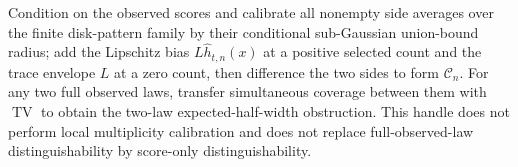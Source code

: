 Condition on the observed scores and calibrate all nonempty side averages over the finite disk-pattern family by their conditional sub-Gaussian union-bound radius; add the Lipschitz bias \(L\widehat h_{t,n}(x)\) at a positive selected count and the trace envelope \(L\) at a zero count, then difference the two sides to form \(\mathcal C_n\). For any two full observed laws, transfer simultaneous coverage between them with \(\operatorname{TV}\) to obtain the two-law expected-half-width obstruction. This handle does not perform local multiplicity calibration and does not replace full-observed-law distinguishability by score-only distinguishability.